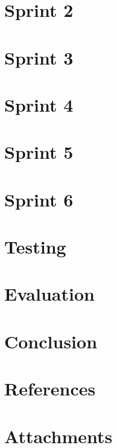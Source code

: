 \documentclass{report}
\begin{document}
\chapter{Sprint 2}


\chapter{Sprint 3}


\chapter{Sprint 4}


\chapter{Sprint 5}


\chapter{Sprint 6}


\chapter{Testing}



\chapter{Evaluation}


\chapter{Conclusion}


\chapter{References}


\chapter{Attachments}


\begin{flushleft}
	
	
\end{flushleft}

\appendix

\end{document}
